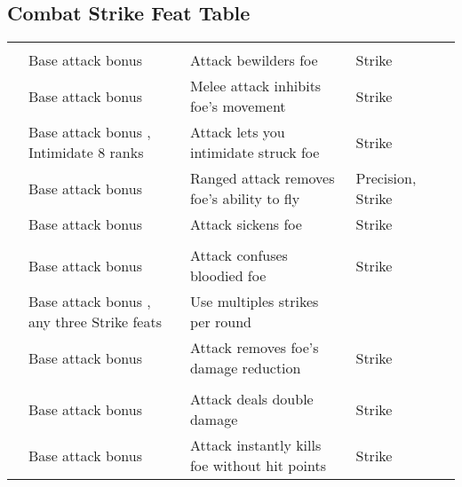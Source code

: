 \subsection{Combat Strike Feat Table}

{\small
    \begin{longtabu}{>{\lcol}p{10em} >{\lcol}p{15em} >{\lcol}X >{\lcol}p{6em} >{\lcol}p{3em}}
         &  &  &  &  \\
         & Base attack bonus  & Attack bewilders foe & Strike &  \\
         & Base attack bonus  & Melee attack inhibits foe's movement & Strike &  \\
         & Base attack bonus , Intimidate 8 ranks & Attack lets you intimidate struck foe & Strike &  \\
         & Base attack bonus  & Ranged attack removes foe's ability to fly & Precision, Strike &  \\
         & Base attack bonus  & Attack sickens foe & Strike &  \\

        \midrule
         &  &  &  &  \\
         & Base attack bonus  & Attack confuses bloodied foe & Strike &  \\
         & Base attack bonus , any three Strike feats & Use multiples strikes per round & \x &  \\
         & Base attack bonus  & Attack removes foe's damage reduction & Strike &  \\

        \midrule
         &  &  &  &  \\
         & Base attack bonus  & Attack deals double damage & Strike &  \\
         & Base attack bonus  & Attack instantly kills foe without hit points & Strike &  \\
    \end{longtabu}
}%

